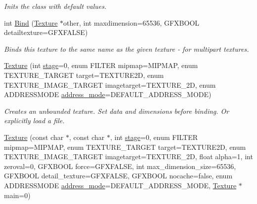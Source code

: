 \begin{DoxyCompactItemize}
\begin{DoxyCompactList}\small\item\em Inits the class with default values. \end{DoxyCompactList}\item 
int \hyperlink{classTexture_a61ad536db7446e794f7029b79216a301}{Bind} (\hyperlink{classTexture}{Texture} $\ast$other, int maxdimension=65536, G\+F\+X\+B\+O\+OL detailtexture=G\+F\+X\+F\+A\+L\+SE)\hypertarget{classTexture_a61ad536db7446e794f7029b79216a301}{}\label{classTexture_a61ad536db7446e794f7029b79216a301}

\begin{DoxyCompactList}\small\item\em Binds this texture to the same name as the given texture -\/ for multipart textures. \end{DoxyCompactList}\item 
\hyperlink{classTexture_ab06b53898d40d647c57b87f5f52238e2}{Texture} (int \hyperlink{classTexture_aa38999434f9fcf409ca20b4523852b7b}{stage}=0, enum F\+I\+L\+T\+ER mipmap=M\+I\+P\+M\+AP, enum T\+E\+X\+T\+U\+R\+E\+\_\+\+T\+A\+R\+G\+ET target=T\+E\+X\+T\+U\+R\+E2D, enum T\+E\+X\+T\+U\+R\+E\+\_\+\+I\+M\+A\+G\+E\+\_\+\+T\+A\+R\+G\+ET imagetarget=T\+E\+X\+T\+U\+R\+E\+\_\+2D, enum A\+D\+D\+R\+E\+S\+S\+M\+O\+DE \hyperlink{classTexture_af3605a5ea18f32b7669cf0db94b12fe6}{address\+\_\+mode}=D\+E\+F\+A\+U\+L\+T\+\_\+\+A\+D\+D\+R\+E\+S\+S\+\_\+\+M\+O\+DE)\hypertarget{classTexture_ab06b53898d40d647c57b87f5f52238e2}{}\label{classTexture_ab06b53898d40d647c57b87f5f52238e2}

\begin{DoxyCompactList}\small\item\em Creates an unbounded texture. Set data and dimensions before binding. Or explicitly load a file. \end{DoxyCompactList}\item 
\hyperlink{classTexture_a22e32e2bfe52be64ca89206a1e18672e}{Texture} (const char $\ast$, const char $\ast$, int \hyperlink{classTexture_aa38999434f9fcf409ca20b4523852b7b}{stage}=0, enum F\+I\+L\+T\+ER mipmap=M\+I\+P\+M\+AP, enum T\+E\+X\+T\+U\+R\+E\+\_\+\+T\+A\+R\+G\+ET target=T\+E\+X\+T\+U\+R\+E2D, enum T\+E\+X\+T\+U\+R\+E\+\_\+\+I\+M\+A\+G\+E\+\_\+\+T\+A\+R\+G\+ET imagetarget=T\+E\+X\+T\+U\+R\+E\+\_\+2D, float alpha=1, int zeroval=0, G\+F\+X\+B\+O\+OL force=G\+F\+X\+F\+A\+L\+SE, int max\+\_\+dimension\+\_\+size=65536, G\+F\+X\+B\+O\+OL detail\+\_\+texture=G\+F\+X\+F\+A\+L\+SE, G\+F\+X\+B\+O\+OL nocache=false, enum A\+D\+D\+R\+E\+S\+S\+M\+O\+DE \hyperlink{classTexture_af3605a5ea18f32b7669cf0db94b12fe6}{address\+\_\+mode}=D\+E\+F\+A\+U\+L\+T\+\_\+\+A\+D\+D\+R\+E\+S\+S\+\_\+\+M\+O\+DE, \hyperlink{classTexture}{Texture} $\ast$main=0)\hypertarget{classTexture_a22e32e2bfe52be64ca89206a1e18672e}{}\label{classTexture_a22e32e2bfe52be64ca89206a1e18672e}


\end{DoxyCompactItemize}
